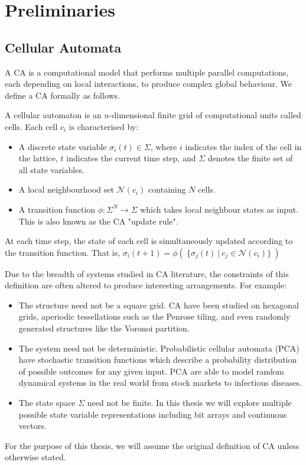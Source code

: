 \chapter{Preliminaries} \label{preliminaries}

\section{Cellular Automata}

A CA is a computational model that performs multiple parallel computations, each depending on local interactions, to produce complex global behaviour. We define a CA formally as follows.

\begin{definition}
A cellular automaton is an $n$-dimensional finite grid of computational units called cells. Each cell $c_i$ is characterised by:
\begin{itemize}
  \item A discrete state variable $\sigma_i(t) \in \Sigma$, where $i$ indicates the index of the cell in the lattice, $t$ indicates the current time step, and $\Sigma$ denotes the finite set of all state variables.
  \item A local neighbourhood set $\mathcal{N}(c_i)$ containing $N$ cells.
  \item A transition function $\phi:\Sigma^N \to \Sigma$ which takes local neighbour states as input. This is also known as the CA "update rule".
\end{itemize}

At each time step, the state of each cell is simultaneously updated according to the transition function. That is, $\sigma_i(t+1) = \phi( \:\{ \sigma_j(t) \: | \: c_j \in \mathcal{N}(c_i) \} \:)$
\end{definition}

Due to the breadth of systems studied in CA literature, the constraints of this definition are often altered to produce interesting arrangements. For example:
\begin{itemize}
  \item The structure need not be a square grid. CA have been studied on hexagonal grids\cite{encinas2007modelling}, aperiodic tessellations such as the Penrose tiling\cite{goucher2012gliders}, and even randomly generated structures like the Voronoi partition\cite{shi2000development}.
  \item The system need not be deterministic. Probabilistic cellular automata (PCA) have stochastic transition functions which describe a probability distribution of possible outcomes for any given input. PCA are able to model random dynamical systems in the real world from stock markets\cite{bartolozzi2004stochastic} to infectious diseases\cite{mikler2005modeling}.
  \item The state space $\Sigma$ need not be finite. In this thesis we will explore multiple possible state variable representations including bit arrays and continuous vectors.
\end{itemize}
For the purpose of this thesis, we will assume the original definition of CA unless otherwise stated.\\

